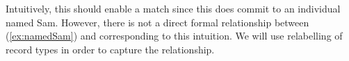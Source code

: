 Intuitively, this should enable a match since this does commit to an
individual named Sam.  However, there is not a direct formal
relationship between (\ref{ex:namedSam}) and \preveg{} corresponding
to this intuition. We will use relabelling of record
types \label{pg:relabelling-intro} in order to
capture the relationship.  
